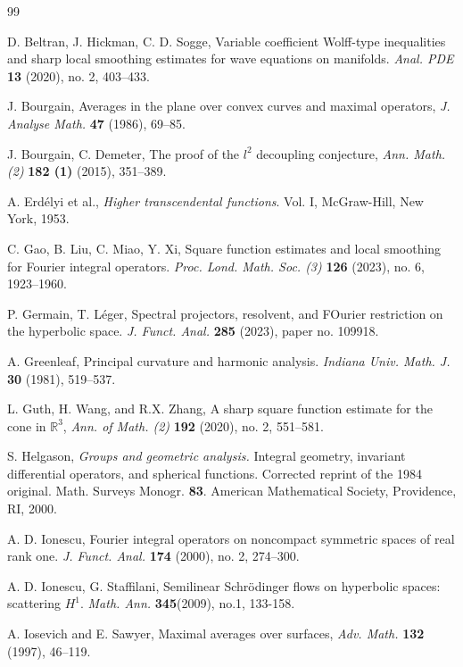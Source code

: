\documentclass[11pt]{amsproc}
\newcommand{\R}{\mathbb{R}}
\newcommand{\0}{\mathbf{0}}
\numberwithin{equation}{section}
\numberwithin{figure}{section}
\theoremstyle{definition}
\theoremstyle{remark}
\numberwithin{thm}{section}
\begin{document}

\begin{thebibliography}{99}

D. Beltran, J. Hickman, C. D. Sogge, Variable coefficient Wolff-type inequalities and sharp local smoothing estimates for wave equations on manifolds. \textit{Anal. PDE} \textbf{13} (2020), no. 2, 403--433.

 J. Bourgain,
Averages in the plane over convex curves and maximal operators, {\it  J. Analyse Math.}
{\bf  47}  (1986), 69--85.


 J. Bourgain, C. Demeter,
The proof of the $l^{2}$ decoupling conjecture,
{\it Ann. Math. (2)}  {\bf 182 (1)} (2015), 351--389.

A. Erd\'{e}lyi et al., \textit{Higher transcendental functions}. Vol. I, McGraw-Hill, New York, 1953.

C. Gao, B. Liu, C. Miao, Y. Xi, Square function estimates and local smoothing for Fourier integral operators. \textit{Proc. Lond. Math. Soc. (3)} \textbf{126} (2023), no. 6, 1923--1960.


P. Germain, T. L\'{e}ger, Spectral projectors, resolvent, and FOurier restriction on the hyperbolic space. \textit{J. Funct. Anal.} \textbf{285} (2023), paper no. 109918.


 A. Greenleaf,  Principal curvature and harmonic analysis. {\it Indiana Univ. Math. J.}
{\bf  30 } (1981),   519--537.

 L. Guth, H. Wang, and R.X. Zhang,
A sharp square function estimate for the cone in $\R^3$,
{\it Ann. of Math. (2)} {\bf 192} (2020), no. 2, 551--581.



S. Helgason, \textit{Groups and geometric analysis.} Integral geometry, invariant differential operators, and spherical functions. Corrected reprint of the 1984 original. Math. Surveys Monogr.  \textbf{83}.
American Mathematical Society, Providence, RI, 2000.

A. D. Ionescu, Fourier integral operators on noncompact symmetric spaces of real rank one. \textit{J. Funct. Anal.} \textbf{174} (2000), no. 2, 274--300.

A. D. Ionescu, G. Staffilani,
Semilinear Schrödinger flows on hyperbolic spaces: scattering $H^1$. \textit{Math. Ann.} \textbf{345}(2009), no.1, 133-158.

 A. Iosevich and E. Sawyer, Maximal averages over surfaces, {\it Adv. Math.} {\bf  132} (1997),   46--119.



\end{thebibliography}
\end{document}
